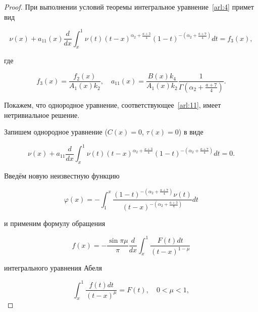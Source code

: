 \begin{proof} При выполнении условий теоремы интегральное уравнение~\eqref{arl:4} примет вид





\begin{equation}

\nu(x)+a_{11}(x)\frac{d}{dx}\int_{x}^{1}\nu(t)(t-x)^{\alpha_2+\frac{a+3}{4}}(1-t)^{-\left(\alpha_2+\frac{a+7}{4}\right)}dt=f_3(x),

\label{arl:11}

\end{equation}

где

$$f_3(x)=\frac{f_2(x)}{A_1(x)k_2}, \quad a_{11}(x)=\frac{B(x)k_4}{A_1(x)k_2}\frac{1}{\Gamma\left(\alpha_2+\frac{a+7}{4}\right)}.$$

Покажем, что однородное уравнение, соответствующее~\eqref{arl:11}, имеет не\-три\-виальное решение.



Запишем однородное уравнение ($C(x)=0$, $\tau(x)=0$) в виде

\begin{equation}

\nu(x)+a_{11}\frac{d}{dx}\int_{x}^{1}\nu(t)(t-x)^{\alpha_2+\frac{a+3}{4}}(1-t)^{-\left(\alpha_2+\frac{a+7}{4}\right)}dt=0.

\label{arl:12}

\end{equation}

Введём новую неизвестную функцию

\begin{equation}

\varphi(x)=-\int_{1}^{x}\frac{(1-t)^{-\left(\alpha_2+\frac{a+7}{4}\right)}\nu(t)}{(t-x)^{-\left(\alpha_2+\frac{a+3}{4}\right)}}dt

\label{arl:13}

\end{equation}

и применим формулу обращения \cite[с. 39]{arl:bib:10}

$$f(x)=-\frac{\sin\pi\mu}{\pi}\frac{d}{dx}\int_{x}^{1}\frac{F(t)dt}{(t-x)^{1-\mu}}$$

интегрального уравнения Абеля

$$\int_{x}^{1}\frac{f(t)dt}{(t-x)^{\mu}}=F(t), \quad 0<\mu<1,$$


\end{proof}
